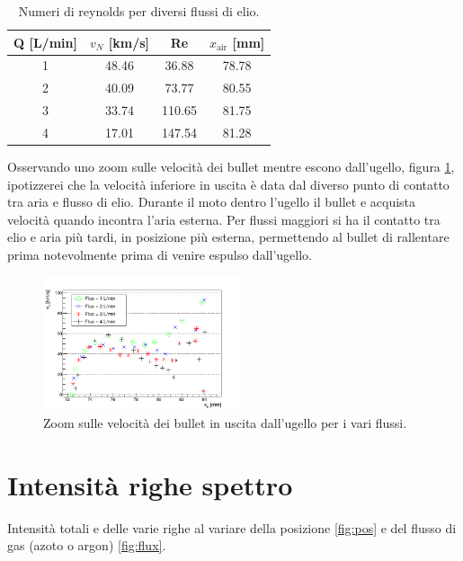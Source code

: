 \documentclass[oneside,11pt,a4paper,italian]{article}
\begin{document}
\begin{table}
  \centering
  \begin{tabular}{cccc}
  \toprule
  Q [L/min]   &$v_{N}$ [km/s]   &Re  &$x_{\text{air}}$ [\si{\milli\meter}]\\
  \midrule
  1    &\num{48.46}    &\num{36.88}  &\num{78.78}\\
  2    &\num{40.09}    &\num{73.77}  &\num{80.55}\\
  3    &\num{33.74}    &\num{110.65}  &\num{81.75}\\
  4    &\num{17.01}    &\num{147.54}  &\num{81.28}\\
  \bottomrule
  \end{tabular}
  \caption{Numeri di reynolds per diversi flussi di elio.}
  \label{tab:rey}
\end{table}


Osservando uno zoom sulle velocità dei bullet mentre escono dall'ugello, figura \ref{fig:zoom}, ipotizzerei che la velocità inferiore in uscita è data dal diverso punto di contatto tra aria e flusso di elio. Durante il moto dentro l'ugello il bullet e acquista velocità quando incontra l'aria esterna. Per flussi maggiori si ha il contatto tra elio e aria più tardi, in posizione più esterna, permettendo al bullet di rallentare prima notevolmente prima di venire espulso dall'ugello.
\begin{figure}
 \centering
 \includegraphics[width=0.52\textwidth]{../Images/Shape/vnoz_flux_zoom.png}
 \caption{Zoom sulle velocità dei bullet in uscita dall'ugello per i vari flussi.}
 \label{fig:zoom}
\end{figure}


\section{Intensità righe spettro}
Intensità totali e delle varie righe al variare della posizione \ref{fig:pos} e del flusso di gas (azoto o argon) \ref{fig:flux}.
\end{document}
